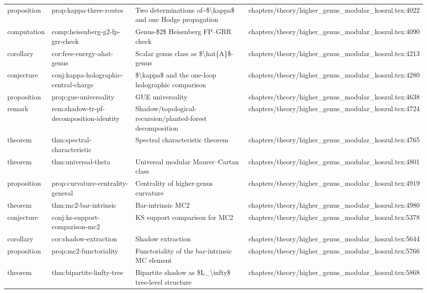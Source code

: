 \documentclass[11pt]{article}
\begin{document}
\begin{longtable}{L{0.10\textwidth}L{0.26\textwidth}L{0.42\textwidth}L{0.22\textwidth}}
proposition & prop:kappa-three-routes & Two determinations of\textasciitilde{}\$\textbackslash{}kappa\$ and one Hodge propagation & chapters/theory/higher\_genus\_modular\_koszul.tex:4022\\
computation & comp:heisenberg-g2-fp-grr-check & Genus-\$2\$ Heisenberg FP--GRR check & chapters/theory/higher\_genus\_modular\_koszul.tex:4090\\
corollary & cor:free-energy-ahat-genus & Scalar genus class as \$\textbackslash{}hat\{A\}\$-genus & chapters/theory/higher\_genus\_modular\_koszul.tex:4213\\
conjecture & conj:kappa-holographic-central-charge & \$\textbackslash{}kappa\$ and the one-loop holographic comparison & chapters/theory/higher\_genus\_modular\_koszul.tex:4280\\
proposition & prop:gue-universality & GUE universality & chapters/theory/higher\_genus\_modular\_koszul.tex:4638\\
remark & rem:shadow-tr-pf-decomposition-identity & Shadow/topological-recursion/planted-forest decomposition & chapters/theory/higher\_genus\_modular\_koszul.tex:4724\\
theorem & thm:spectral-characteristic & Spectral characteristic theorem & chapters/theory/higher\_genus\_modular\_koszul.tex:4765\\
theorem & thm:universal-theta & Universal modular Maurer--Cartan class & chapters/theory/higher\_genus\_modular\_koszul.tex:4801\\
proposition & prop:curvature-centrality-general & Centrality of higher-genus curvature & chapters/theory/higher\_genus\_modular\_koszul.tex:4919\\
theorem & thm:mc2-bar-intrinsic & Bar-intrinsic MC2 & chapters/theory/higher\_genus\_modular\_koszul.tex:4980\\
conjecture & conj:ks-support-comparison-mc2 & KS support comparison for MC2 & chapters/theory/higher\_genus\_modular\_koszul.tex:5378\\
corollary & cor:shadow-extraction & Shadow extraction & chapters/theory/higher\_genus\_modular\_koszul.tex:5644\\
proposition & prop:mc2-functoriality & Functoriality of the bar-intrinsic MC element & chapters/theory/higher\_genus\_modular\_koszul.tex:5766\\
theorem & thm:bipartite-linfty-tree & Bipartite shadow as \$L\_\textbackslash{}infty\$ tree-level structure & chapters/theory/higher\_genus\_modular\_koszul.tex:5868\\

\end{longtable}
\end{document}
